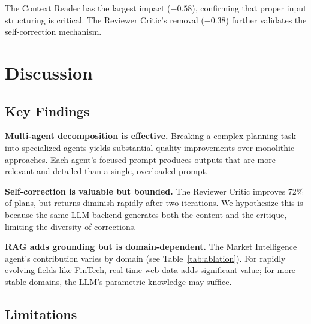 \documentclass[journal]{IEEEtran}
\begin{document}
The Context Reader has the largest impact ($-0.58$), confirming that proper input structuring is critical. The Reviewer Critic's removal ($-0.38$) further validates the self-correction mechanism.

\section{Discussion}
\label{sec:discussion}

\subsection{Key Findings}

\textbf{Multi-agent decomposition is effective.} Breaking a complex planning task into specialized agents yields substantial quality improvements over monolithic approaches. Each agent's focused prompt produces outputs that are more relevant and detailed than a single, overloaded prompt.

\textbf{Self-correction is valuable but bounded.} The Reviewer Critic improves 72\% of plans, but returns diminish rapidly after two iterations. We hypothesize this is because the same LLM backend generates both the content and the critique, limiting the diversity of corrections.

\textbf{RAG adds grounding but is domain-dependent.} The Market Intelligence agent's contribution varies by domain (see Table~\ref{tab:ablation}). For rapidly evolving fields like FinTech, real-time web data adds significant value; for more stable domains, the LLM's parametric knowledge may suffice.

\subsection{Limitations}
\end{document}
